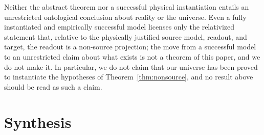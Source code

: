 \documentclass[11pt,reqno]{amsart}
\theoremstyle{plain}
\theoremstyle{definition}
\theoremstyle{remark}
\begin{document}
Neither the abstract theorem nor a successful physical instantiation entails an unrestricted ontological conclusion about reality or the universe. Even a fully instantiated and empirically successful model licenses only the relativized statement that, relative to the physically justified source model, readout, and target, the readout is a non-source projection; the move from a successful model to an unrestricted claim about what exists is not a theorem of this paper, and we do not make it. In particular, we do not claim that our universe has been proved to instantiate the hypotheses of Theorem~\ref{thm:nonsource}, and no result above should be read as such a claim.

\section{Synthesis}\label{sec:synthesis}
\end{document}
